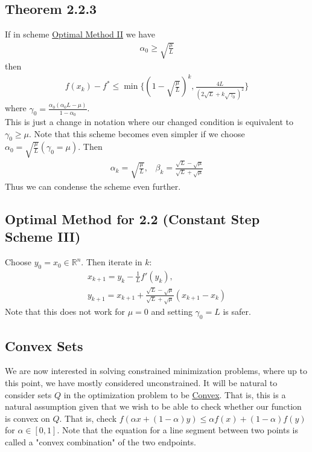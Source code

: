 \documentclass[12pt,a4paper]{article}
\begin{document}
	\subsection*{Theorem 2.2.3}\label{thm223}
	If in scheme \hyperref[sec22optvar2]{Optimal Method II} we have
	\begin{align*}
		\alpha_0 \geq \sqrt{\frac{\mu}{L}}
	\end{align*}
	then
	\begin{align*}
		f(x_k) - f^* \leq \min \{(1 - \sqrt{\frac{\mu}{L}})^k, \frac{4L}{(2\sqrt{L} + k \sqrt{\gamma_0} )^2}\}
	\end{align*}
	where $\gamma_0 = \frac{\alpha_0(\alpha_0L - \mu)}{1 - \alpha_0}$.\\
	
	This is just a change in notation where our changed condition is equivalent to $\gamma_0 \geq \mu$. Note that this scheme becomes even simpler if we choose $\alpha_0 = \sqrt{\frac{\mu}{L}} (\gamma_0 = \mu)$. Then
	\begin{align*}
		\alpha_k = \sqrt{\frac{\mu}{L}}, \hspace{10pt} \beta_k = \frac{\sqrt{L} - \sqrt{\mu}}{\sqrt{L} + \sqrt{\mu}}
	\end{align*}
	Thus we can condense the scheme even further.
	\subsection*{Optimal Method for 2.2 (Constant Step Scheme III)}
	Choose $y_0 = x_0 \in \mathbb{R}^n$. Then iterate in $k$:
	\begin{align*}
		x_{k+1} = y_k - \frac{1}{L}f'(y_k), \\
		y_{k+1} = x_{k+1} + \frac{\sqrt{L} - \sqrt{\mu}}{\sqrt{L} + \sqrt{\mu}}(x_{k+1} - x_k)
	\end{align*}
	Note that this does not work for $\mu = 0$ and setting $\gamma_0 = L$ is safer.
	
	\subsection*{Convex Sets}
	We are now interested in solving constrained minimization problems, where up to this point, we have mostly considered unconstrained. It will be natural to consider sets $Q$ in the optimization problem to be \hyperref[sec:Def]{Convex}. That is, this is a natural assumption given that we wish to be able to check whether our function is convex on $Q$. That is, check $f(\alpha x + (1 - \alpha)y) \leq \alpha f(x) + (1 - \alpha)f(y)$ for $\alpha \in [0,1]$. Note that the equation for a line segment between two points is called a "convex combination" of the two endpoints.
	
\end{document}
